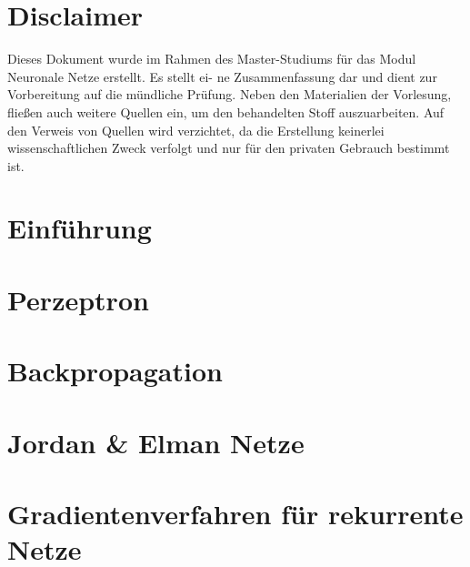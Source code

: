 \documentclass[fleqn,10pt]{SelfArx} %
\begin{document}

\section*{Disclaimer}
Dieses Dokument wurde im Rahmen des Master-Studiums
für das Modul Neuronale Netze erstellt. Es stellt ei-
ne Zusammenfassung dar und dient zur Vorbereitung auf die
mündliche Prüfung. Neben den Materialien der Vorlesung,
fließen auch weitere Quellen ein, um den behandelten Stoff
auszuarbeiten. Auf den Verweis von Quellen wird verzichtet,
da die Erstellung keinerlei wissenschaftlichen Zweck verfolgt
und nur für den privaten Gebrauch bestimmt ist.

\section{Einführung} 


\section{Perzeptron}


\section{Backpropagation}


\section{Jordan \& Elman Netze}


\section{Gradientenverfahren für rekurrente Netze}

\end{document}
